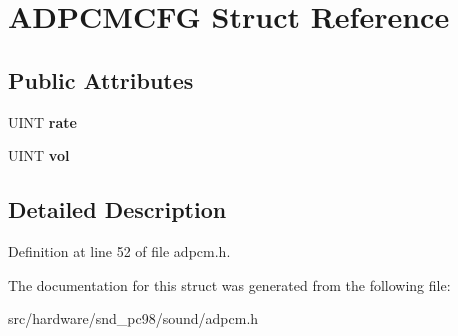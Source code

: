 \hypertarget{structADPCMCFG}{\section{A\-D\-P\-C\-M\-C\-F\-G Struct Reference}
\label{structADPCMCFG}
}
\subsection*{Public Attributes}
\begin{DoxyCompactItemize}
\item 
\hypertarget{structADPCMCFG_ad2d8d42e7b3015d17f9b33d23f787517}{U\-I\-N\-T {\bfseries rate}}\label{structADPCMCFG_ad2d8d42e7b3015d17f9b33d23f787517}

\item 
\hypertarget{structADPCMCFG_a0afa31b835a1dd6ae514388bc0444b44}{U\-I\-N\-T {\bfseries vol}}\label{structADPCMCFG_a0afa31b835a1dd6ae514388bc0444b44}

\end{DoxyCompactItemize}


\subsection{Detailed Description}


Definition at line 52 of file adpcm.\-h.



The documentation for this struct was generated from the following file\-:\begin{DoxyCompactItemize}
\item 
src/hardware/snd\-\_\-pc98/sound/adpcm.\-h\end{DoxyCompactItemize}
